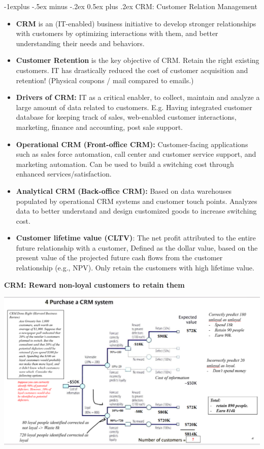 \documentclass[12pt, landscape]{article}
\makeatletter
\renewcommand{\subsection}{\@startsection{subsection}{2}{0mm}%
                                {-1explus -.5ex minus -.2ex}%
                                {0.5ex plus .2ex}%
                                {\normalfont\normalsize\bfseries}}
\makeatother
\begin{document}
\begin{multicols*}{3}
\subsection{CRM: Customer Relation Management}
\begin{itemize}
\item \textbf{CRM} is an (IT-enabled) business initiative to develop stronger relationships with customers by optimizing interactions with them, and better understanding their needs and behaviors.
\item \textbf{Customer Retention} is the key objective of CRM. Retain the right existing customers. IT has drastically reduced the cost of customer acquisition and retention! (Physical coupons / mail compared to emails.)
\item \textbf{Drivers of CRM:} IT as a critical enabler, to collect, maintain and analyze a large amount of data related to customers. E.g. Having integrated customer database for keeping track of sales, web-enabled customer interactions, marketing, finance and accounting, post sale support.
\item \textbf{Operational CRM (Front-office CRM):} Customer-facing applications such as sales force automation, call center and customer service support, and marketing automation. Can be used to build a switching cost through enhanced services/satisfaction.
\item \textbf{Analytical CRM (Back-office CRM):} Based on data warehouses populated by operational CRM systems and customer touch points. Analyzes data to better understand and design customized goods to increase switching cost.
\item \textbf{Customer lifetime value (CLTV)}: The net profit attributed to the entire future relationship with a customer, Defined as the dollar value, based on the present value of the projected future cash flows from the customer relationship (e.g., NPV). Only retain the customers with high lifetime value. 
\end{itemize}
\textbf{CRM: Reward non-loyal customers to retain them}
\centerline{\includegraphics[width=0.80\linewidth]{CRM}}


\end{multicols*}
\end{document}
